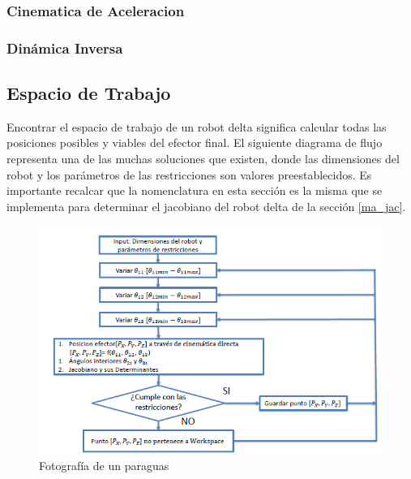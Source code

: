 \begin{algorithm}
\end{algorithm}

        \newpage

\subsubsection{Cinematica de Aceleracion}

            \newpage


\subsubsection{Dinámica Inversa}
        \newpage

        
    \subsection{Espacio de Trabajo}
     Encontrar el espacio de trabajo de un robot delta significa calcular todas las posiciones posibles y viables del efector final. El siguiente diagrama de flujo representa una de las muchas soluciones que existen, donde las dimensiones del robot y los parámetros de las restricciones son valores preestablecidos. Es importante recalcar que la nomenclatura en esta sección es la misma que se implementa para determinar el jacobiano del robot delta de la sección \ref{ma_jac}.  
    
             \begin{figure}[htb]
                \centering
                \includegraphics[width=1\linewidth]{Main/Chapter6/Images6/cap6_ws_2.png}
                \caption{Fotografía de un paraguas}
                \label{f:Cap6_ws_2}
            \end{figure}  

